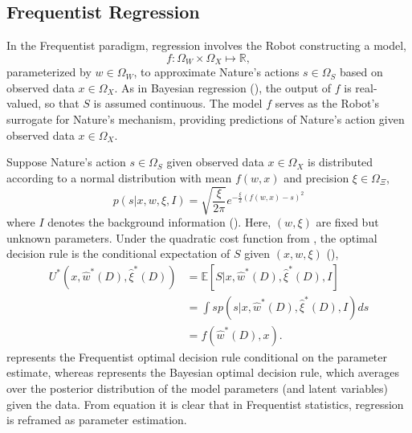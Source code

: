 \subsection{Frequentist Regression}
\label{chp:frequentist_regression}
In the Frequentist paradigm, regression involves the Robot constructing a model,
\begin{equation}
	f: \Omega_W \times \Omega_X \mapsto \mathbb{R},
\end{equation}
parameterized by $w \in \Omega_W$, to approximate Nature's actions $s\in \Omega_S$ based on observed data $x\in \Omega_X$. As in Bayesian regression (), the output of $f$ is real-valued, so that $S$ is assumed continuous. The model $f$ serves as the Robot's surrogate for Nature's mechanism, providing predictions of Nature's action given observed data $x \in \Omega_X$. \newline

Suppose Nature's action $s\in\Omega_S$ given observed data $x\in \Omega_X$ is distributed according to a normal distribution with mean $f(w,x)$ and precision $\xi \in \Omega_{\Xi}$,
\begin{equation}
	p(s | x, w, \xi, I) 
	= \sqrt{\frac{\xi}{2\pi}} e^{-\frac{\xi}{2}(f(w,x)-s)^2}
	\label{freq:dist}
\end{equation}
where $I$ denotes the background information (). Here, $(w,\xi)$ are fixed but unknown parameters. Under the quadratic cost function from , the optimal decision rule is the conditional expectation of $S$ given $(x,w,\xi)$ (),
\begin{equation}
	\begin{split}
		U^*(x,\hat{w}^*(D),\hat{\xi}^*(D)) &= \mathbb{E}[S | x, \hat{w}^*(D), \hat{\xi}^*(D), I]\\
		&= \int s p(s | x, \hat{w}^*(D), \hat{\xi}^*(D), I) ds\\
		& = f(\hat{w}^*(D),x).
	\end{split}
	\label{freq:decision}
\end{equation}
 represents the Frequentist optimal decision rule conditional on the parameter estimate, whereas  represents the Bayesian optimal decision rule, which averages over the posterior distribution of the model parameters (and latent variables) given the data. From equation  it is clear that in Frequentist statistics, regression is reframed as parameter estimation.

